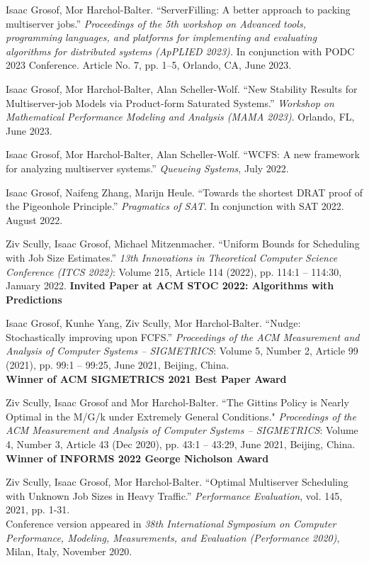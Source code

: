 \documentclass{res}
\begin{document}
\begin{resume}
    Isaac Grosof, Mor Harchol-Balter. ``ServerFilling: A better approach to packing multiserver jobs.''
    \textit{Proceedings of the 5th workshop on Advanced tools, programming languages, and platforms for implementing and evaluating algorithms for distributed systems (ApPLIED 2023).}
    In conjunction with PODC 2023 Conference. Article No. 7, pp. 1--5, Orlando, CA, June 2023.

    Isaac Grosof, Mor Harchol-Balter, Alan Scheller-Wolf. ``New Stability Results for Multiserver-job Models via Product-form Saturated Systems.'' \textit{Workshop on Mathematical Performance Modeling and Analysis (MAMA 2023)}. Orlando, FL, June 2023.

    Isaac Grosof, Mor Harchol-Balter, Alan Scheller-Wolf.
    ``WCFS: A new framework for analyzing multiserver systems.''
    \textit{Queueing Systems}, July 2022.

    Isaac Grosof, Naifeng Zhang, Marijn Heule.
    ``Towards the shortest DRAT proof of the Pigeonhole Principle.''
    \textit{Pragmatics of SAT.} In conjunction with SAT 2022. August 2022.

    Ziv Scully, Isaac Grosof, Michael Mitzenmacher.
    ``Uniform Bounds for Scheduling with Job Size Estimates.'' 
    \textit{13th Innovations in Theoretical Computer Science Conference (ITCS 2022)}:
    Volume 215, Article 114 (2022), pp. 114:1 -- 114:30, January 2022.
    \textbf{Invited Paper at ACM STOC 2022: Algorithms with Predictions}

    Isaac Grosof, Kunhe Yang, Ziv Scully, Mor Harchol-Balter.
    ``Nudge: Stochastically improving upon FCFS.''
    \textit{Proceedings of the ACM Measurement and Analysis of Computer Systems -- SIGMETRICS}: Volume 5, Number 2, Article 99 (2021), pp. 99:1 -- 99:25, June 2021, Beijing, China.\\
    \textbf{Winner of ACM SIGMETRICS 2021 Best Paper Award}

    Ziv Scully, Isaac Grosof and Mor Harchol-Balter.
    ``The Gittins Policy is Nearly Optimal in the M/G/k under Extremely General Conditions."
    \textit{Proceedings of the ACM Measurement and Analysis of Computer Systems -- SIGMETRICS}: Volume 4, Number 3, Article 43 (Dec 2020), pp. 43:1 -- 43:29, June 2021, Beijing, China. \\
    \textbf{Winner of INFORMS 2022 George Nicholson Award}

    Ziv Scully, Isaac Grosof, Mor Harchol-Balter.
    ``Optimal Multiserver Scheduling with Unknown Job Sizes in Heavy Traffic.''
    \textit{Performance Evaluation}, vol. 145, 2021, pp. 1-31. \\
    Conference version appeared in
    \textit{38th International Symposium on Computer Performance, Modeling, Measurements, and Evaluation (Performance 2020)},
    Milan, Italy, November 2020.


\end{resume}
\end{document}
